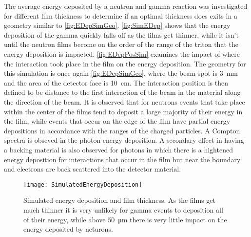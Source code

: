 The average energy deposited by a neutron and gamma reaction was investigated for different film thickness to determine if an optimal thickness does exits in a geometry similar to \autoref{fig:EDepSimGeo}.
\autoref{fig:SimEDep} shows that the energy deposition of the gamma quickly falls off as the films get thinner, while it isn't until the neutron films become on the order of the range of the triton that the energy deposition is impacted.
\autoref{fig:EDepPosSim} examines the impact of where the interaction took place in the film on the energy deposition.
The geometry for this simulation is once again \autoref{fig:EDepSimGeo}, where the beam spot is \SI{3}{\mm} and the area of the detector face is \SI{10}{\cm}. 
The interaction position is then defined to be distance to the first interaction of the beam in the material along the direction of the beam.
It is observed that for neutrons events that take place within the center of the films tend to deposit a large majority of their energy in the film, while events that occur on the edge of the film have partial energy depositions in accordance with the ranges of the charged particles.
A Compton spectra is obseved in the photon energy deposition. 
A secondary effect in having a backing material is also observed for photons in which there is a hightened energy deposition for interactions that occur in the film but near the boundary and electrons are back scattered into the detector material.
\begin{figure}
  \centering
  \texttt{[image: SimulatedEnergyDeposition]}
  \caption[Simulated Energy Deposition and Film Thickness]{Simulated energy deposition and film thickness.  As the films get much thinner it is very unlikely for gamma events to deposition all of their energy, while above \SI{50}{\um} there is very little impact on the energy deposited by neturons.}
  \label{fig:SimEDep}
\end{figure}

